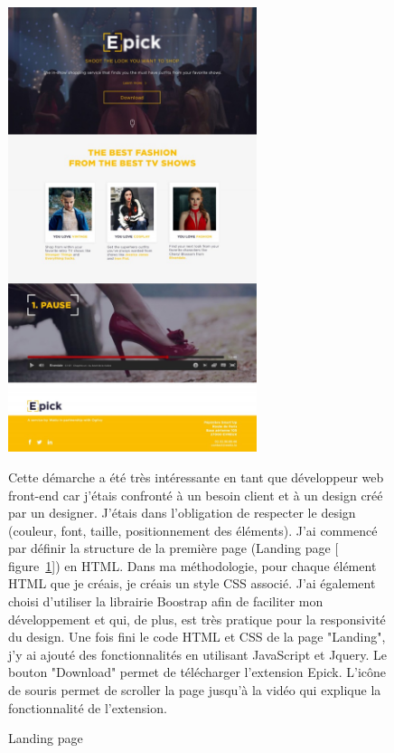 \documentclass[a4paper, 12pt]{report}
\begin{document}
\begin{figure}[t]
\begin{minipage}{0.5\linewidth}
\includegraphics[height=13cm]{images/Epick_Landing_page.jpg}
\caption{Landing page}
\label{fig:4.5}
\end{minipage}\hfill
\begin{minipage}{0.45\textwidth}
Cette démarche a été très intéressante en tant que développeur web front-end car j'étais confronté à un besoin client et à un design créé par un designer.
J'étais dans l'obligation de respecter le design (couleur, font, taille, positionnement des éléments).
J’ai commencé par définir la structure de la première page (Landing page [ figure~\ref{fig:4.5}]) en HTML. Dans ma méthodologie, pour chaque élément HTML que je créais, je créais un style CSS associé. J'ai également choisi d'utiliser la librairie Boostrap afin de faciliter mon développement et qui, de plus, est très pratique pour la responsivité du design.
Une fois fini le code HTML et CSS de la page "Landing", j'y ai ajouté des fonctionnalités en utilisant JavaScript et Jquery.
Le bouton "Download" permet de télécharger l'extension Epick. L’icône de souris permet de scroller la page jusqu'à la vidéo qui explique la fonctionnalité de l'extension.\\
\linebreak
\end{minipage}
\end{figure}
\end{document}
